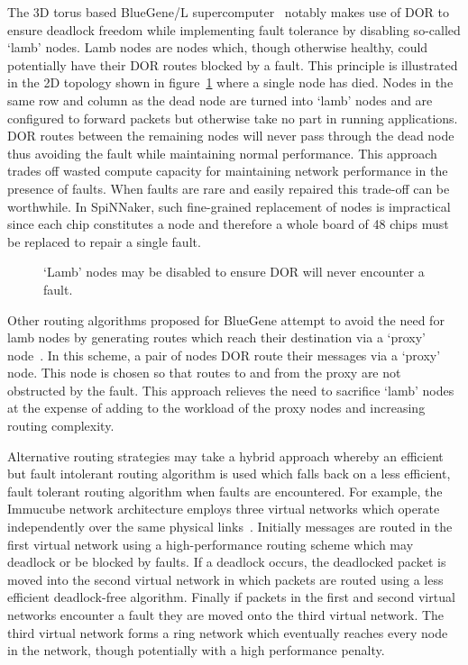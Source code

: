 			The 3D torus based BlueGene/L supercomputer~\cite{adiga02} notably makes
			use of DOR to ensure deadlock freedom while implementing fault tolerance
			by disabling so-called `lamb' nodes. Lamb nodes are nodes which, though
			otherwise healthy, could potentially have their DOR routes blocked by a
			fault. This principle is illustrated in the 2D topology shown in
			figure~\ref{fig:lamb-nodes} where a single node has died. Nodes in the
			same row and column as the dead node are turned into `lamb' nodes and are
			configured to forward packets but otherwise take no part in running
			applications. DOR routes between the remaining nodes will never pass
			through the dead node thus avoiding the fault while maintaining normal
			performance. This approach trades off wasted compute capacity for
			maintaining network performance in the presence of faults. When faults
			are rare and easily repaired this trade-off can be worthwhile. In
			SpiNNaker, such fine-grained replacement of nodes is impractical since
			each chip constitutes a node and therefore a whole board of 48 chips must
			be replaced to repair a single fault.
			
			\begin{figure}
				\center
				
				\caption[Avoiding faults using `lamb' nodes and DOR.]%
				{`Lamb' nodes may be disabled to ensure DOR will never
				encounter a fault.}
				\label{fig:lamb-nodes}
			\end{figure}
			
			Other routing algorithms proposed for BlueGene attempt to avoid the need
			for lamb nodes by generating routes which reach their destination via a
			`proxy' node~\cite{gomez04}. In this scheme, a pair of nodes DOR route
			their messages via a `proxy' node.  This node is chosen so that routes
			to and from the proxy are not obstructed by the fault.  This approach
			relieves the need to sacrifice `lamb' nodes at the expense of adding to
			the workload of the proxy nodes and increasing routing complexity.
			
			Alternative routing strategies may take a hybrid approach whereby an
			efficient but fault intolerant routing algorithm is used which falls back
			on a less efficient, fault tolerant routing algorithm when faults are
			encountered. For example, the Immucube network architecture employs three
			virtual networks which operate independently over the same physical
			links~\cite{puente07}. Initially messages are routed in the first virtual
			network using a high-performance routing scheme which may deadlock or be
			blocked by faults.  If a deadlock occurs, the deadlocked packet is moved
			into the second virtual network in which packets are routed using a less
			efficient deadlock-free algorithm. Finally if packets in the first and
			second virtual networks encounter a fault they are moved onto the third
			virtual network. The third virtual network forms a ring network which
			eventually reaches every node in the network, though potentially with a
			high performance penalty.
			
